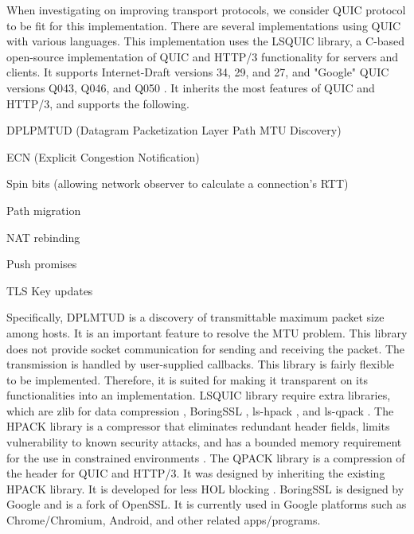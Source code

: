 When investigating on improving transport protocols, we consider QUIC protocol to be fit for this implementation. There are several implementations using QUIC with various languages. This implementation uses the LSQUIC library, a C-based open-source implementation of QUIC and HTTP/3 functionality for servers and clients. It supports Internet-Draft versions 34, 29, and 27, and "Google" QUIC versions Q043, Q046, and Q050 \cite{lsquic}. It inherits the most features of QUIC and HTTP/3, and supports the following.

\begin{description}
	\item DPLPMTUD (Datagram Packetization Layer Path MTU Discovery) \cite{fairhurst2018packetization}
	\item ECN (Explicit Congestion Notification) \cite{draftjohanssonquicecn00}\cite{fairhurst2017benefits}
	\item Spin bits (allowing network observer to calculate a connection’s RTT)
	\item Path migration
	\item NAT rebinding
	\item Push promises
	\item TLS Key updates
\end{description}

Specifically, DPLMTUD is a discovery of transmittable maximum packet size among hosts. It is an important feature to resolve the MTU problem. This library does not provide socket communication for sending and receiving the packet. The transmission is handled by user-supplied callbacks. This library is fairly flexible to be implemented. Therefore, it is suited for making it transparent on its functionalities into an implementation. LSQUIC library require extra libraries, which are zlib for data compression \cite{zlib}, BoringSSL \cite{BoringSSL}, ls-hpack \cite{hpack}, and ls-qpack \cite{lsqpack}. The HPACK library is a compressor that eliminates redundant header fields, limits vulnerability to known security attacks, and has a bounded memory requirement for the use in constrained environments \cite{TheNetworkAccessIdentifier}. The QPACK library is a compression of the header for QUIC and HTTP/3. It was designed by inheriting the existing HPACK library. It is developed for less HOL blocking \cite{draftietfquicqpack21}. BoringSSL is designed by Google and is a fork of OpenSSL. It is currently used in Google platforms such as Chrome/Chromium, Android, and other related apps/programs.

